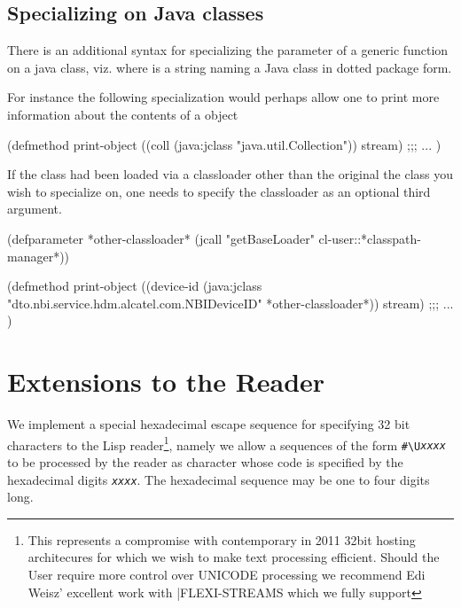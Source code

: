 \documentclass[10pt]{book}
\begin{document}
\subsection{Specializing on Java classes}

There is an additional syntax for specializing the parameter of a
generic function on a java class, viz. 
where  is a string naming a Java class in dotted package
form.

For instance the following specialization would perhaps allow one to
print more information about the contents of a 
object

\begin{listing-lisp}
(defmethod print-object ((coll (java:jclass "java.util.Collection"))
                         stream)
  ;;; ...
)
\end{listing-lisp}

If the class had been loaded via a classloader other than the original
the class you wish to specialize on, one needs to specify the
classloader as an optional third argument.

\begin{listing-lisp}

(defparameter *other-classloader*
  (jcall "getBaseLoader" cl-user::*classpath-manager*))
  
(defmethod print-object
   ((device-id (java:jclass "dto.nbi.service.hdm.alcatel.com.NBIDeviceID" 
                            *other-classloader*))
    stream)
  ;;; ...
)
\end{listing-lisp}

\section{Extensions to the Reader}

We implement a special hexadecimal escape sequence for specifying 32
bit characters to the Lisp reader\footnote{This represents a
  compromise with contemporary in 2011 32bit hosting architecures for
  which we wish to make text processing efficient.  Should the User
  require more control over \textsc{UNICODE} processing we recommend Edi Weisz'
  excellent work with \textsc|{FLEXI-STREAMS}  which we fully support}, namely we
allow a sequences of the form \verb~#\U~\emph{\texttt{xxxx}} to be processed
by the reader as character whose code is specified by the hexadecimal
digits \emph{\texttt{xxxx}}.  The hexadecimal sequence may be one to four digits
long.
\end{document}
